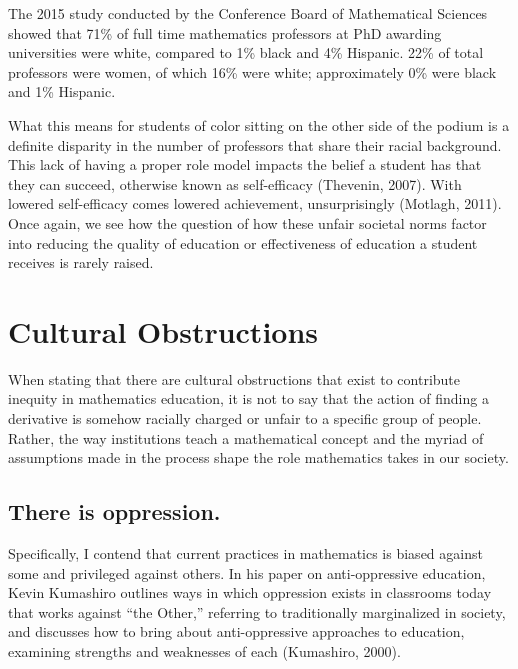 The 2015 study conducted by the Conference Board of Mathematical Sciences showed that 71\% of full time mathematics professors at PhD awarding universities were white, compared to 1\% black and 4\% Hispanic. 22\% of total professors were women, of which 16\% were white; approximately 0\% were black and 1\% Hispanic.

What this means for students of color sitting on the other side of the podium is a definite disparity in the number of professors that share their racial background. This lack of having a proper role model impacts the belief a student has that they can succeed, otherwise known as self-efficacy (Thevenin, 2007). With lowered self-efficacy comes lowered achievement, unsurprisingly (Motlagh, 2011). Once again, we see how the question of how these unfair societal norms factor into reducing the quality of education or effectiveness of education a student receives is rarely raised.

\section{Cultural Obstructions}
When stating that there are cultural obstructions that exist to contribute inequity in mathematics education, it is not to say that the action of finding a derivative is somehow racially charged or unfair to a specific group of people. Rather, the way institutions teach a mathematical concept and the myriad of assumptions made in the process shape the role mathematics takes in our society.

\subsection{There is oppression.}
Specifically, I contend that current practices in mathematics is biased against some and privileged against others. In his paper on anti-oppressive education, Kevin Kumashiro outlines ways in which oppression exists in classrooms today that works against ``the Other,'' referring to traditionally marginalized in society, and discusses how to bring about anti-oppressive approaches to education, examining strengths and weaknesses of each (Kumashiro, 2000).

